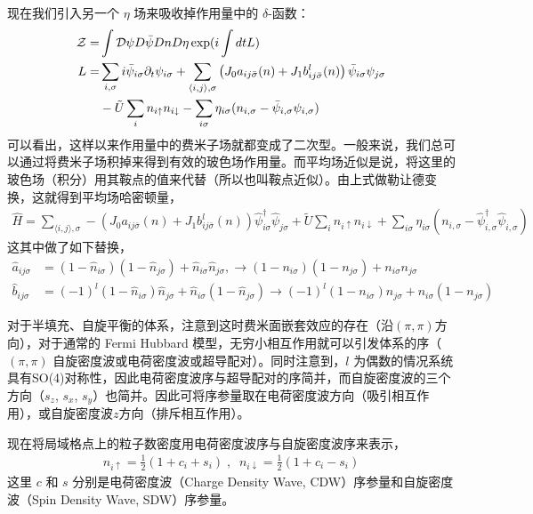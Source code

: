 现在我们引入另一个 $\eta$ 场来吸收掉作用量中的 $\delta$-函数：
\begin{align}
\mathcal{Z}=&\int \mathcal D\psi D\bar\psi Dn D\eta\exp(i\int dt L)\\
L=&\sum_{i,\sigma} i\bar \psi_{i\sigma}\partial_t\psi_{i\sigma}+\sum_{\langle i,j\rangle, \sigma} \left(J_0a_{ij\bar{\sigma}}(n) + J_1b_{ij\bar{\sigma}}^l(n)\right)\bar \psi_{i\sigma}\psi_{j\sigma}  \notag \\&- \tilde{U}\sum_{i}n_{i\uparrow}n_{i\downarrow}-\sum_{i \sigma}\eta_{i\sigma}(n_{i,\sigma}-\bar\psi_{i,\sigma}\psi_{i,\sigma})
\end{align}
可以看出，这样以来作用量中的费米子场就都变成了二次型。一般来说，我们总可以通过将费米子场积掉来得到有效的玻色场作用量。而平均场近似是说，将这里的玻色场（积分）用其鞍点的值来代替（所以也叫鞍点近似）。由上式做勒让德变换，这就得到平均场哈密顿量，
\begin{align}\label{eq:Hmf0}
    \hat{H} = \sum_{\langle i,j\rangle, \sigma} - \left(J_0a_{ij\bar{\sigma}}(n) + J_1b_{ij\bar{\sigma}}^l(n)\right)\hat{\psi}^{\dagger}_{i\sigma}\hat{\psi}_{j\sigma}  + \tilde{U}\sum_{i}n_{i\uparrow}n_{i\downarrow}+\sum_{i \sigma}\eta_{i\sigma}(n_{i,\sigma}-\hat{\psi}^{\dagger}_{i,\sigma}\hat{\psi}_{i,\sigma}) 
\end{align}
这其中做了如下替换，
 \begin{align}
    \hat{a}_{ij\sigma} &= (1-\hat{n}_{i\sigma})(1-\hat{n}_{j\sigma}) + \hat{n}_{i\sigma}\hat{n}_{j\sigma}, \rightarrow (1-n_{i\sigma})(1-n_{j\sigma}) + n_{i\sigma}n_{j\sigma}\\
    \hat{b}_{ij\sigma} &= (-1)^l(1-\hat{n}_{i\sigma})\hat{n}_{j\sigma} + \hat{n}_{i\sigma}(1-\hat{n}_{j\sigma})\rightarrow (-1)^l(1-n_{i\sigma})n_{j\sigma} + n_{i\sigma}(1-n_{j\sigma})
 \end{align}

对于半填充、自旋平衡的体系，注意到这时费米面嵌套效应的存在（沿$(\pi,\pi)$方向），对于通常的 Fermi Hubbard 模型，无穷小相互作用就可以引发体系的序（$(\pi,\pi)$ 自旋密度波或电荷密度波或超导配对）。同时注意到，$l$ 为偶数的情况系统具有SO(4)对称性，因此电荷密度波序与超导配对的序简并\cite{yang1990}，而自旋密度波的三个方向（$s_z$, $s_x$, $s_y$）也简并\cite{yang1990}。因此可将序参量取在电荷密度波方向（吸引相互作用），或自旋密度波$z$方向（排斥相互作用）\cite{floqhubb}。

现在将局域格点上的粒子数密度用电荷密度波序与自旋密度波序来表示，
\begin{align}
    n_{i\uparrow} = \frac{1}{2}(1 + c_i + s_i ) \;,\;\; n_{i\downarrow} = \frac{1}{2}(1+c_i-s_i)
\end{align}
这里 $c$ 和 $s$ 分别是电荷密度波（Charge Density Wave, CDW）序参量和自旋密度波（Spin Density Wave, SDW）序参量。

